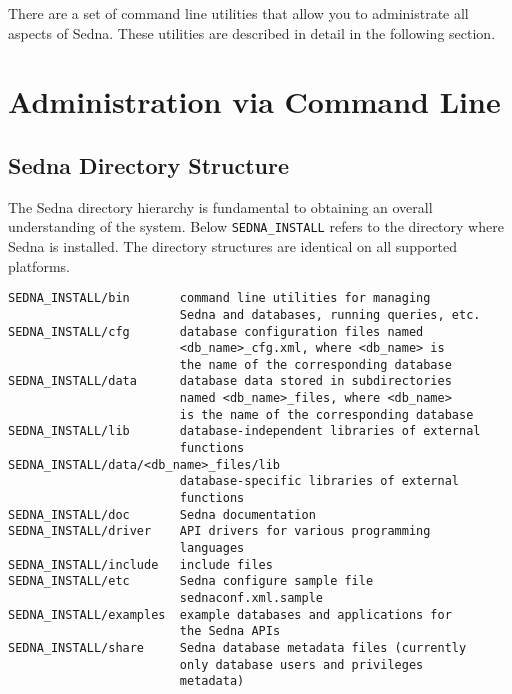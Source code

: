 \documentclass[a4paper,12pt]{article}
\begin{document}
There are a set of command line utilities that allow you to administrate all
aspects of Sedna. These utilities are described in detail in the following
section.


\section{Administration via Command Line}
\subsection{Sedna Directory Structure}
\label{sec:dir-structure}

The Sedna directory hierarchy is fundamental to obtaining an overall
understanding of the system. Below \verb!SEDNA_INSTALL! refers to the directory
where Sedna is installed. The directory structures are identical on all
supported platforms.

\small{
\begin{verbatim}
SEDNA_INSTALL/bin       command line utilities for managing
                        Sedna and databases, running queries, etc.
SEDNA_INSTALL/cfg       database configuration files named
                        <db_name>_cfg.xml, where <db_name> is
                        the name of the corresponding database
SEDNA_INSTALL/data      database data stored in subdirectories
                        named <db_name>_files, where <db_name>
                        is the name of the corresponding database
SEDNA_INSTALL/lib       database-independent libraries of external
                        functions
SEDNA_INSTALL/data/<db_name>_files/lib
                        database-specific libraries of external
                        functions
SEDNA_INSTALL/doc       Sedna documentation
SEDNA_INSTALL/driver    API drivers for various programming
                        languages
SEDNA_INSTALL/include   include files
SEDNA_INSTALL/etc       Sedna configure sample file 
                        sednaconf.xml.sample
SEDNA_INSTALL/examples  example databases and applications for
                        the Sedna APIs
SEDNA_INSTALL/share     Sedna database metadata files (currently
                        only database users and privileges
                        metadata)
\end{verbatim}}
\end{document}
